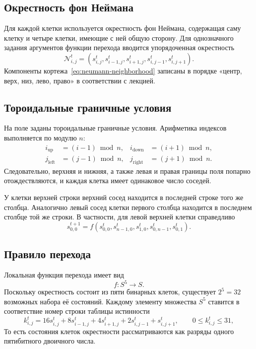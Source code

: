 \subsection{Окрестность фон Неймана}

Для каждой клетки используется окрестность фон Неймана, содержащая саму
клетку и четыре клетки, имеющие с ней общую сторону. Для однозначного задания
аргументов функции перехода вводится упорядоченная окрестность
\begin{equation}
    \mathcal{N}_{i,j}^{t} =
    \left(
        s^t_{i,j},
        s^t_{i-1,j},
        s^t_{i+1,j},
        s^t_{i,j-1},
        s^t_{i,j+1}
    \right).
    \label{eq:neumann-neighborhood}
\end{equation}
Компоненты кортежа~\eqref{eq:neumann-neighborhood} записаны в порядке
«центр, верх, низ, лево, право» в соответствии с лекцией.

\subsection{Тороидальные граничные условия}

На поле заданы тороидальные граничные условия. Арифметика индексов выполняется
по модулю $n$:
\begin{align}
    i_{\mathrm{up}} &= (i-1) \bmod n,
    & i_{\mathrm{down}} &= (i+1) \bmod n, \\
    j_{\mathrm{left}} &= (j-1) \bmod n,
    & j_{\mathrm{right}} &= (j+1) \bmod n.
\end{align}
Следовательно, верхняя и нижняя, а также левая и правая границы поля попарно
отождествляются, и каждая клетка имеет одинаковое число соседей.

У клетки верхней строки верхний сосед находится в последней строке того же
столбца. Аналогично левый сосед клетки первого столбца находится в последнем
столбце той же строки. В частности, для левой верхней клетки справедливо
\begin{equation}
    s^{t+1}_{0,0} = f\left(
        s^t_{0,0},
        s^t_{n-1,0},
        s^t_{1,0},
        s^t_{0,n-1},
        s^t_{0,1}
    \right).
\end{equation}

\subsection{Правило перехода}

Локальная функция перехода имеет вид
\begin{equation}
    f \colon S^5 \to S.
\end{equation}
Поскольку окрестность состоит из пяти бинарных клеток, существует
$2^5 = 32$ возможных набора её состояний. Каждому элементу множества $S^5$
ставится в соответствие номер строки таблицы истинности
\begin{equation}
    k^t_{i,j} =
        16s^t_{i,j}
        + 8s^t_{i-1,j}
        + 4s^t_{i+1,j}
        + 2s^t_{i,j-1}
        + s^t_{i,j+1},
    \qquad 0 \leq k^t_{i,j} \leq 31,
    \label{eq:combination-index}
\end{equation}
То есть состояния клеток окрестности рассматриваются как разряды одного
пятибитного двоичного числа.

